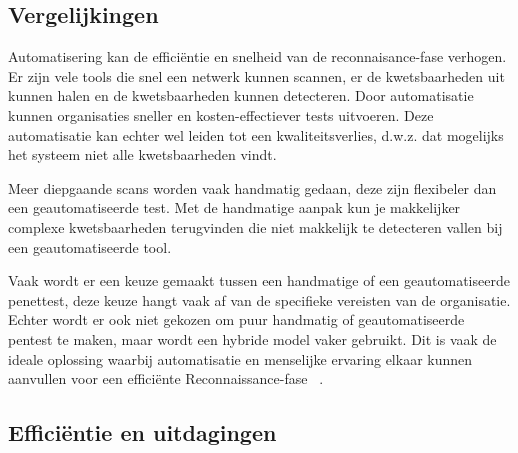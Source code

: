 \subsection{Vergelijkingen}

Automatisering kan de efficiëntie en snelheid van de reconnaisance-fase verhogen. Er zijn vele tools die snel een netwerk kunnen scannen, 
er de kwetsbaarheden uit kunnen halen en de kwetsbaarheden kunnen detecteren. Door automatisatie kunnen 
organisaties sneller en kosten-effectiever tests uitvoeren. Deze automatisatie kan echter wel leiden tot een kwaliteitsverlies, 
d.w.z. dat mogelijks het systeem niet alle kwetsbaarheden vindt. ~\autocite{peris}

Meer diepgaande scans worden vaak handmatig gedaan, deze zijn flexibeler dan een geautomatiseerde test. 
Met de handmatige aanpak kun je makkelijker complexe kwetsbaarheden terugvinden die niet makkelijk te detecteren vallen bij 
een geautomatiseerde tool.~\autocite{techtarget} 

Vaak wordt er een keuze gemaakt tussen een handmatige of een geautomatiseerde penettest, deze keuze hangt vaak af van de specifieke  
vereisten van de organisatie. Echter wordt er ook niet gekozen om puur handmatig of geautomatiseerde pentest te maken, maar wordt
een hybride model vaker gebruikt. Dit is vaak de ideale oplossing waarbij automatisatie en menselijke ervaring elkaar kunnen 
aanvullen voor een efficiënte Reconnaissance-fase ~\autocite{techtarget}.

\subsection{Efficiëntie en uitdagingen}


